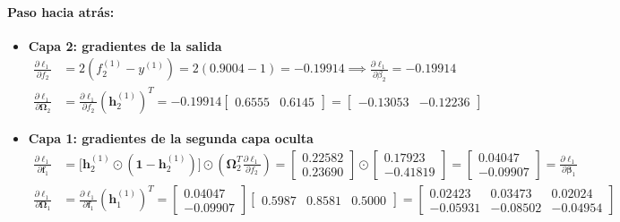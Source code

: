 \documentclass[10pt,a4paper]{article}
\begin{document}
\paragraph{Paso hacia atrás:}
\begin{itemize}
    \item \textbf{Capa 2: gradientes de la salida}
    \begin{align*}
    \frac{\partial \ell_1}{\partial f_2} &= 2(f_2^{(1)} - y^{(1)}) = 2(0.9004 - 1) = -0.19914 \implies \frac{\partial \ell_1}{\partial \beta_2} = \mathbf{-0.19914} \\[0.1cm]
    \frac{\partial \ell_1}{\partial \boldsymbol{\Omega}_2} &= \frac{\partial \ell_1}{\partial f_2} (\mathbf{h}_2^{(1)})^T = -0.19914 \begin{bmatrix} 0.6555 & 0.6145 \end{bmatrix} = \mathbf{\begin{bmatrix} -0.13053 & -0.12236 \end{bmatrix}}
    \end{align*}

    \item \textbf{Capa 1: gradientes de la segunda capa oculta}
    \begin{align*}
    \frac{\partial \ell_1}{\partial \mathbf{f}_1} &= \big[ \mathbf{h}_2^{(1)} \odot (\mathbf{1} - \mathbf{h}_2^{(1)}) \big] \odot \left( \boldsymbol{\Omega}_2^T \frac{\partial \ell_1}{\partial f_2} \right) = \begin{bmatrix} 0.22582 \\ 0.23690 \end{bmatrix} \odot \begin{bmatrix} 0.17923 \\ -0.41819 \end{bmatrix} = \mathbf{\begin{bmatrix} 0.04047 \\ -0.09907 \end{bmatrix}} = \frac{\partial \ell_1}{\partial \boldsymbol{\beta}_1} \\[0.1cm]
    \frac{\partial \ell_1}{\partial \boldsymbol{\Omega}_1} &= \frac{\partial \ell_1}{\partial \mathbf{f}_1} (\mathbf{h}_1^{(1)})^T = \begin{bmatrix} 0.04047 \\ -0.09907 \end{bmatrix} \begin{bmatrix} 0.5987 & 0.8581 & 0.5000 \end{bmatrix} = \mathbf{\begin{bmatrix} 0.02423 & 0.03473 & 0.02024 \\ -0.05931 & -0.08502 & -0.04954 \end{bmatrix}}
    \end{align*}


\end{itemize}
\end{document}

